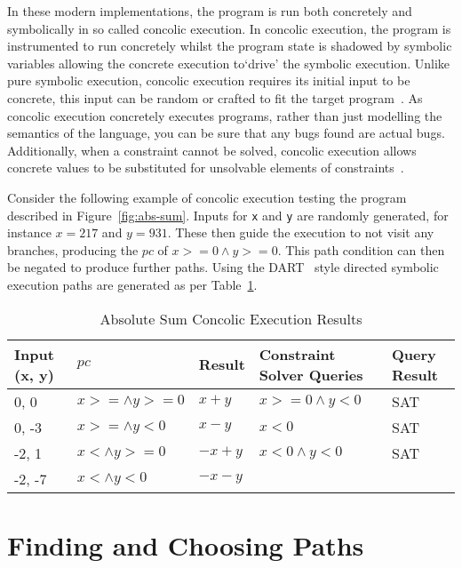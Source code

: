 \documentclass[]{final_report}
\begin{document}
In these modern implementations, the program is run both concretely and symbolically in so called concolic execution. In concolic execution, the program is instrumented to run concretely whilst the program state is shadowed by symbolic variables allowing the concrete execution to`drive' the symbolic execution. Unlike pure symbolic execution, concolic execution requires its initial input to be concrete, this input can be random or crafted to fit the target program~\cite{godefroid2008grammar,cadar2013symbolic}. As concolic execution concretely executes programs, rather than just modelling the semantics of the language, you can be sure that any bugs found are actual bugs. Additionally, when a constraint cannot be solved, concolic execution allows concrete values to be substituted for unsolvable elements of constraints~\cite{sen2007concolic,sen2005cute}.

Consider the following example of concolic execution testing the program described in Figure~\ref{fig:abs-sum}. Inputs for \lstinline{x} and \lstinline{y} are randomly generated, for instance $x=217$ and $y=931$. These then guide the execution to not visit any branches, producing the $pc$ of $x >= 0 \land y >=0$. This path condition can then be negated to produce further paths. Using the DART~\cite{godefroid2005dart} style directed symbolic execution paths are generated as per Table~\ref{abs-sum-ce-table}.

\begin{table}[]
\centering
\begin{tabular}{|l|l|l|l|l|}
\hline
Input (x, y) & $pc$ & Result & Constraint Solver Queries & Query Result \\ \hline
0, 0 & $x >= \land y >= 0$ & $x+y$ & $x >=0 \land y < 0 $ & SAT \\ \hline
0, -3 & $x >= \land y < 0$ & $x - y$ & $x <0 $ & SAT \\ \hline
-2, 1 & $x < \land y >= 0$ & $-x+y$ & $x<0 \land y < 0 $ & SAT \\ \hline
-2, -7 & $x < \land y < 0$ & $-x-y$ &  &  \\ \hline
\end{tabular}
\caption{Absolute Sum Concolic Execution Results}
\label{abs-sum-ce-table}
\end{table}


\section{Finding and Choosing Paths}
\end{document}
